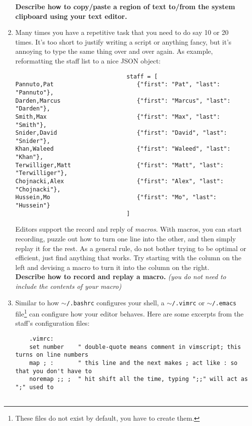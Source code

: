 \documentclass{article}
\begin{document}
\begin{enumerate}
    \textbf{Describe how to copy/paste a region of text to/from the system
    clipboard using your text editor.}
    \vspace{4em}
  \item Many times you have a repetitive task that you need to do say 10 or 20
    times. It's too short to justify writing a script or anything fancy, but
    it's annoying to type the same thing over and over again. As example,
    reformatting the staff list to a nice JSON object:
    \begin{verbatim}                                staff = [
Pannuto,Pat                        {"first": "Pat", "last": "Pannuto"},
Darden,Marcus                      {"first": "Marcus", "last": "Darden"},
Smith,Max                          {"first": "Max", "last": "Smith"},
Snider,David                       {"first": "David", "last": "Snider"},
Khan,Waleed                        {"first": "Waleed", "last": "Khan"},
Terwilliger,Matt                   {"first": "Matt", "last": "Terwilliger"},
Chojnacki,Alex                     {"first": "Alex", "last": "Chojnacki"},
Hussein,Mo                         {"first": "Mo", "last": "Hussein"}
                                ]\end{verbatim}
    Editors support the record and reply of \emph{macros}. With macros, you
    can start recording, puzzle out how to turn one line into the other, and
    then simply replay it for the rest. As a general rule, do not bother
    trying to be optimal or efficient, just find anything that works.
    Try starting with the column on the left and devising a macro to turn it
    into the column on the right.\\
    \textbf{Describe how to record and replay a macro.}
    \emph{\small (you do not need to include the contents of your macro)}
    \vspace{4em}
\newpage
  \item Similar to how \texttt{$\sim$/.bashrc} configures your shell, a
    \texttt{$\sim$/.vimrc} or \texttt{$\sim$/.emacs} file\footnote{
      These files do not exist by default, you have to create them.
    } can configure how your editor behaves. Here are some excerpts from the
    staff's configuration files:
    \begin{lstlisting}
    .vimrc:
    set number    " double-quote means comment in vimscript; this turns on line numbers
    map ; :       " this line and the next makes ; act like : so that you don't have to
    noremap ;; ;  " hit shift all the time, typing ";;" will act as ";" used to


\end{lstlisting}
\end{enumerate}
\end{document}
